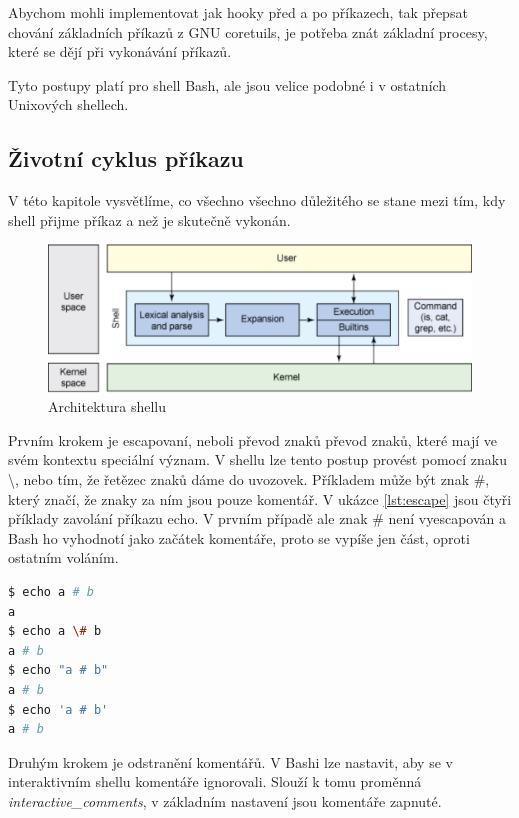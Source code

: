 \documentclass[thesis=M,czech]{FITthesis}[2012/06/26]
\begin{document}
Abychom mohli implementovat jak hooky před a po příkazech, tak přepsat chování základních příkazů z GNU coretuils, je potřeba znát základní procesy, které se dějí při vykonávání příkazů.

Tyto postupy platí pro shell Bash, ale jsou velice podobné i v ostatních Unixových shellech.

%
%
%
\subsection{Životní cyklus příkazu}

V této kapitole vysvětlíme, co všechno všechno důležitého se stane mezi tím, kdy shell přijme příkaz a než je skutečně vykonán. 

\begin{figure}[htb]\centering
	\includegraphics[width=\textwidth]{./images/shell_arch2}
	\caption{Architektura shellu}
	\label{fig:shell_arch}
\end{figure}


Prvním krokem je escapovaní, neboli převod znaků převod znaků, které mají ve svém kontextu speciální význam. V shellu lze tento postup provést pomocí znaku \textbackslash, nebo tím, že řetězec znaků dáme do uvozovek. Příkladem může být znak \#, který značí, že znaky za ním jsou pouze komentář. V ukázce \ref{lst:escape} jsou čtyři příklady zavolání příkazu echo. V prvním případě ale znak \# není vyescapován a Bash ho vyhodnotí jako začátek komentáře, proto se vypíše jen část, oproti ostatním voláním.

\begin{minipage}{\linewidth}
\begin{lstlisting}[language=bash, caption={Escapovaní v shellu}, label={lst:escape}]
$ echo a # b
a
$ echo a \# b
a # b
$ echo "a # b"
a # b
$ echo 'a # b'
a # b
\end{lstlisting}
\end{minipage}

Druhým krokem je odstranění komentářů. V Bashi lze nastavit, aby se v interaktivním shellu komentáře ignorovali. Slouží k tomu proměnná \textit{interactive\_comments}, v základním nastavení jsou komentáře zapnuté.
\end{document}
